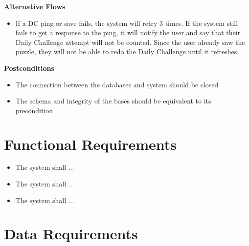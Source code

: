 \documentclass[12pt]{article}
\newcounter{reqnum} %
\begin{document}
\textbf{Alternative Flows}
\begin{itemize}
\item If a DC ping or save fails, the system will retry 3 times. If the system still fails to get a response to the ping, it will notify the user and say that their Daily Challenge attempt will not be counted. Since the user already saw the puzzle, they will not be able to redo the Daily Challenge until it refreshes.
\end{itemize}

\textbf{Postconditions}
\begin{itemize}
\item The connection between the databases and system should be closed
\item The schema and integrity of the bases should be equivalent to its precondition 
\end{itemize}

\section{Functional Requirements}


\noindent \begin{itemize}

\item[FR\refstepcounter{reqnum}\thereqnum \label{FR_Label1}:] The system shall ...

\item[FR\refstepcounter{reqnum}\thereqnum \label{FR_Label2}:] The system shall ...

\item[FR\refstepcounter{reqnum}\thereqnum \label{FR_Label3}:] The system shall ...

\end{itemize}


\section{Data Requirements}
\end{document}
